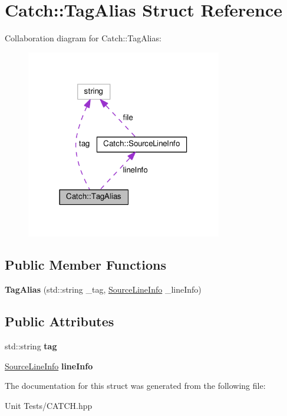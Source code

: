 \hypertarget{structCatch_1_1TagAlias}{}\section{Catch\+:\+:Tag\+Alias Struct Reference}
\label{structCatch_1_1TagAlias}


Collaboration diagram for Catch\+:\+:Tag\+Alias\+:
\nopagebreak
\begin{figure}[H]
\begin{center}
\leavevmode
\includegraphics[width=242pt]{structCatch_1_1TagAlias__coll__graph}
\end{center}
\end{figure}
\subsection*{Public Member Functions}
\begin{DoxyCompactItemize}
\item 
{\bfseries Tag\+Alias} (std\+::string \+\_\+tag, \hyperlink{structCatch_1_1SourceLineInfo}{Source\+Line\+Info} \+\_\+line\+Info)\hypertarget{structCatch_1_1TagAlias_ad9124d03bfb6f767f1c97572330b05bc}{}\label{structCatch_1_1TagAlias_ad9124d03bfb6f767f1c97572330b05bc}

\end{DoxyCompactItemize}
\subsection*{Public Attributes}
\begin{DoxyCompactItemize}
\item 
std\+::string {\bfseries tag}\hypertarget{structCatch_1_1TagAlias_a950183883ab17c90d0fab16b966b6e2d}{}\label{structCatch_1_1TagAlias_a950183883ab17c90d0fab16b966b6e2d}

\item 
\hyperlink{structCatch_1_1SourceLineInfo}{Source\+Line\+Info} {\bfseries line\+Info}\hypertarget{structCatch_1_1TagAlias_a2f51fe0b3c052561275d26b6eb88f702}{}\label{structCatch_1_1TagAlias_a2f51fe0b3c052561275d26b6eb88f702}

\end{DoxyCompactItemize}


The documentation for this struct was generated from the following file\+:\begin{DoxyCompactItemize}
\item 
Unit Tests/C\+A\+T\+C\+H.\+hpp\end{DoxyCompactItemize}
